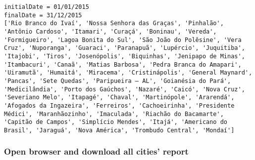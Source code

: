 \begin{lstlisting}
initialDate = 01/01/2015
finalDate = 31/12/2015
['Rio Branco do Ivaí', 'Nossa Senhora das Graças', 'Pinhalão', 'Antônio Cardoso', 'Itamari', 'Curaçá', 'Boninau', 'Vereda', 'Formigueiro', 'Lagoa Bonita do Sul', 'São João do Polêsine', 'Vera Cruz', 'Nuporanga', 'Guaraci', 'Paranapuã', 'Lupércio', 'Juquitiba', 'Itajobi', 'Tiros', 'Josenópolis', 'Biquinhas', 'Jenipapo de Minas', 'Itambacuri', 'Canaã', 'Matias Barbosa', 'Pedra Branca do Amapari', 'Uiramutã', 'Humaitá', 'Miracema', 'Cristinápolis', 'General Maynard', 'Pancas', 'Sete Quedas', 'Paripueira – AL', 'Goianésia do Pará', 'Medicilândia', 'Porto dos Gaúchos', 'Nazaré', 'Caicó', 'Nova Cruz', 'Severiano Melo', 'Itapagé', 'Chaval', 'Martinópole', 'Ararendá', 'Afogados da Ingazeira', 'Ferreiros', 'Cachoeirinha', 'Presidente Médici', 'Maranhãozinho', 'Imaculada', 'Riachão do Bacamarte', 'Capitão de Campos', 'Simplício Mendes', 'Itajá', 'Americano do Brasil', 'Jaraguá', 'Nova América', 'Trombudo Central', 'Mondaí']
\end{lstlisting}

\subsubsection{Open browser and download all cities'
report}\label{open-browser-and-download-all-cities-report}


